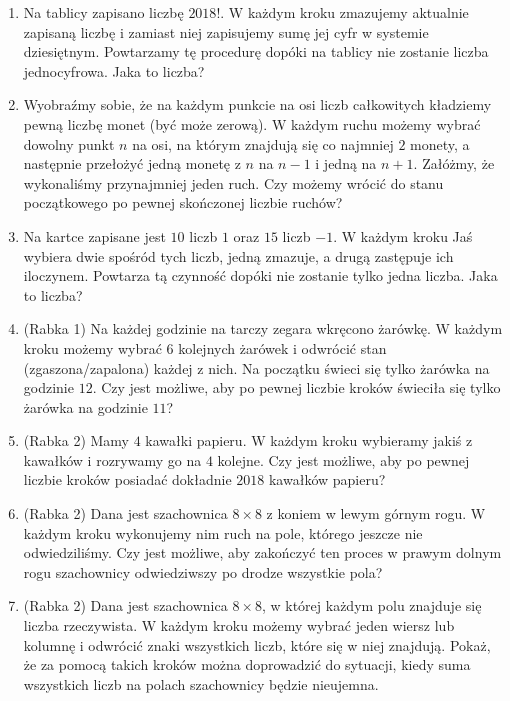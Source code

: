 \documentclass{article}
\begin{document}
\begin{enumerate}
\begin{enumerate}[\roman*.]
\begin{enumerate}[1.]
				\item Na tablicy zapisano liczbę $2018!$. W każdym kroku zmazujemy aktualnie zapisaną liczbę i zamiast niej zapisujemy sumę jej cyfr w systemie dziesiętnym. Powtarzamy tę procedurę dopóki na tablicy nie zostanie liczba jednocyfrowa. Jaka to liczba?
				
				\item Wyobraźmy sobie, że na każdym punkcie na osi liczb całkowitych kładziemy pewną liczbę monet (być może zerową). W każdym ruchu możemy wybrać dowolny punkt $n$ na osi, na którym znajdują się co najmniej $2$ monety, a następnie przełożyć jedną monetę z $n$ na $n-1$ i jedną na $n+1$. Załóżmy, że wykonaliśmy przynajmniej jeden ruch. Czy możemy wrócić do stanu początkowego po pewnej skończonej liczbie ruchów?
				
				\item Na kartce zapisane jest $10$ liczb $1$ oraz $15$ liczb $-1$. W każdym kroku Jaś wybiera dwie spośród tych liczb, jedną zmazuje, a drugą zastępuje ich iloczynem. Powtarza tą czynność dopóki nie zostanie tylko jedna liczba. Jaka to liczba?
				
				\item (Rabka 1) Na każdej godzinie na tarczy zegara wkręcono żarówkę. W każdym kroku możemy wybrać $6$ kolejnych żarówek i odwrócić stan (zgaszona/zapalona) każdej z nich. Na początku świeci się tylko żarówka na godzinie $12$. Czy jest możliwe, aby po pewnej liczbie kroków świeciła się tylko żarówka na godzinie $11$?
				
				\item (Rabka 2) Mamy $4$ kawałki papieru. W każdym kroku wybieramy jakiś z kawałków i rozrywamy go na $4$ kolejne. Czy jest możliwe, aby po pewnej liczbie kroków posiadać dokładnie $2018$ kawałków papieru?
				
				\item (Rabka 2) Dana jest szachownica $8 \times 8$ z koniem w lewym górnym rogu. W każdym kroku wykonujemy nim ruch na pole, którego jeszcze nie odwiedziliśmy. Czy jest możliwe, aby zakończyć ten proces w prawym dolnym rogu szachownicy odwiedziwszy po drodze wszystkie pola?
				
				\item (Rabka 2) Dana jest szachownica $8 \times 8$, w której każdym polu znajduje się liczba rzeczywista. W każdym kroku możemy wybrać jeden wiersz lub kolumnę i odwrócić znaki wszystkich liczb, które się w niej znajdują. Pokaż, że za pomocą takich kroków można doprowadzić do sytuacji, kiedy suma wszystkich liczb na polach szachownicy będzie nieujemna.
				

\end{enumerate}
\end{enumerate}
\end{enumerate}
\end{document}
